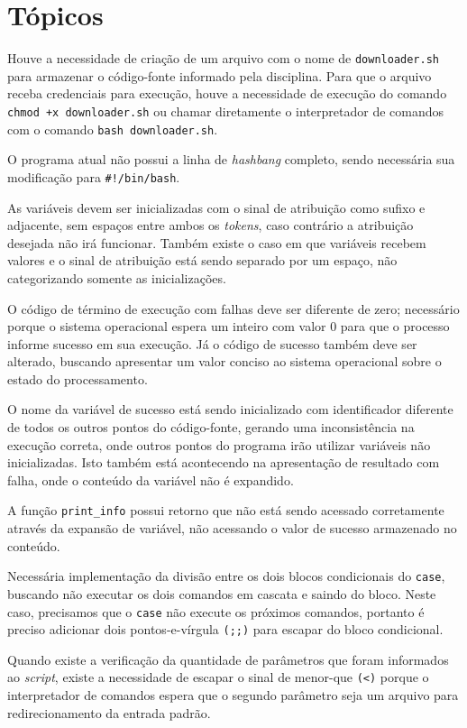 \documentclass{article}
\begin{document}
\section{Tópicos}

Houve a necessidade de criação de um arquivo com o nome de
\texttt{downloader.sh} para armazenar o código-fonte informado pela disciplina.
Para que o arquivo receba credenciais para execução, houve a necessidade de
execução do comando \texttt{chmod +x downloader.sh} ou chamar diretamente o
interpretador de comandos com o comando \texttt{bash downloader.sh}.

O programa atual não possui a linha de \textit{hashbang} completo, sendo
necessária sua modificação para \texttt{\#!/bin/bash}.

As variáveis devem ser inicializadas com o sinal de atribuição como sufixo e
adjacente, sem espaços entre ambos os \textit{tokens}, caso contrário a
atribuição desejada não irá funcionar. Também existe o caso em que variáveis
recebem valores e o sinal de atribuição está sendo separado por um espaço, não
categorizando somente as inicializações.

O código de término de execução com falhas deve ser diferente de zero;
necessário porque o sistema operacional espera um inteiro com valor 0 para que o
processo informe sucesso em sua execução. Já o código de sucesso também deve ser
alterado, buscando apresentar um valor conciso ao sistema operacional sobre o
estado do processamento.

O nome da variável de sucesso está sendo inicializado com identificador
diferente de todos os outros pontos do código-fonte, gerando uma inconsistência
na execução correta, onde outros pontos do programa irão utilizar variáveis não
inicializadas. Isto também está acontecendo na apresentação de resultado com
falha, onde o conteúdo da variável não é expandido.

A função \texttt{print\_info} possui retorno que não está sendo acessado
corretamente através da expansão de variável, não acessando o valor de sucesso
armazenado no conteúdo.

Necessária implementação da divisão entre os dois blocos condicionais do
\texttt{case}, buscando não executar os dois comandos em cascata e saindo do
bloco. Neste caso, precisamos que o \texttt{case} não execute os próximos
comandos, portanto é preciso adicionar dois pontos-e-vírgula \texttt{(;;)}
para escapar do bloco condicional.

Quando existe a verificação da quantidade de parâmetros que foram informados ao
\textit{script}, existe a necessidade de escapar o sinal de menor-que
\texttt{(<)} porque o interpretador de comandos espera que o segundo parâmetro
seja um arquivo para redirecionamento da entrada padrão.
\end{document}
